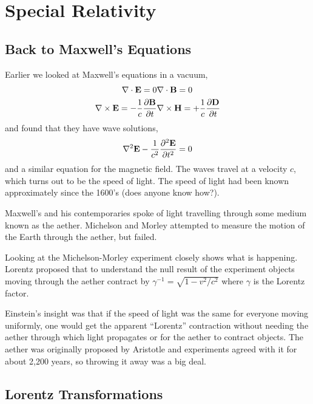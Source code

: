 \chapter{Special Relativity}
\label{cha:special-relativity}
\section{Back to Maxwell's Equations}
\label{sec:back-maxw-equat}
Earlier we looked at Maxwell's equations in a vacuum,
\begin{eqnarray}
{\bf \nabla} \cdot {\bf E} = 0 & {\bf \nabla} \cdot {\bf B} =
0 \nonumber \\
{\bf \nabla} \times {\bf E} = -\frac{1}{c} \frac{\partial {\bf
    B}}{\partial t} &
{\bf \nabla} \times {\bf H} = +\frac{1}{c} 
\frac{\partial {\bf D}}{\partial t} 
\label{eq:265}
\end{eqnarray}
and found that they have wave solutions,
\begin{equation}
 {\bf   \nabla}^2 {\bf E}
-\frac{1}{c^2} \frac{\partial^2 {\bf E}}{\partial t^2} = 0
\label{eq:266}
\end{equation}
and a similar equation for the magnetic field.  The waves travel at a
velocity $c$, which turns out to be the speed of light.  The speed of
light had been known approximately since the 1600's (does anyone know
how?). 

Maxwell's and his contemporaries spoke of light travelling through
some medium known as the aether.  Michelson and Morley attempted to
measure the motion of the Earth through the aether, but failed.

Looking at the Michelson-Morley experiment closely shows what is
happening.  Lorentz proposed that to understand the null result of the
experiment objects moving through the aether contract by
$\gamma^{-1}=\sqrt{1-v^2/c^2}$ where $\gamma$ is the Lorentz factor.

Einstein's insight was that if the speed of light was the same for
everyone moving uniformly, one would get the apparent ``Lorentz''
contraction without needing the aether through which light propagates
or for the aether to contract objects.  The aether was originally
proposed by Aristotle and experiments agreed with it for about 2,200
years, so throwing it away was a big deal.

\section{Lorentz Transformations} 
\label{sec:lorentz-transf}

